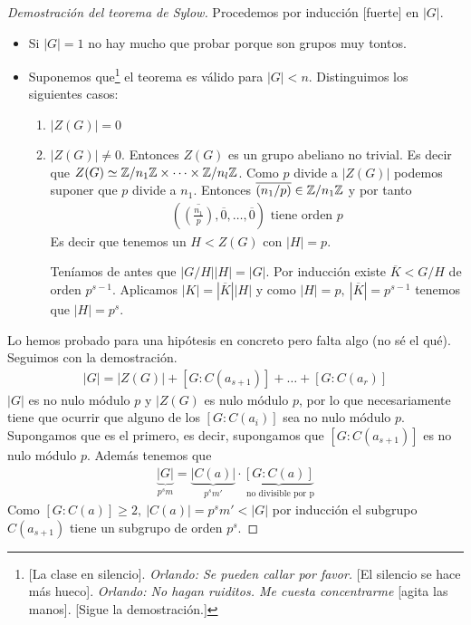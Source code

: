 \begin{proof}[Demostración del teorema de Sylow]
	Procedemos por inducción [fuerte] en $|G|$.
	\begin{itemize}
		\item Si $|G| = 1$ no hay mucho que probar porque son grupos muy tontos.
		\item Suponemos que\footnote{[La clase en silencio]. \textit{Orlando: Se pueden callar por favor.} [El silencio se hace más hueco]. \textit{Orlando: No hagan ruiditos. Me cuesta concentrarme} [agita las manos]. [Sigue la demostración.]} el teorema es válido para $|G| < n$. Distinguimos los siguientes casos:
		\begin{enumerate}
			\item $|Z(G)| = 0$
			\item $|Z(G)| \neq 0$. Entonces $Z(G)$ es un grupo abeliano no trivial. Es decir que $Z(G) \simeq \mathbb{Z}/n_1\mathbb{Z} \times \dots \times \mathbb{Z}/n_l\mathbb{Z}$. Como $p$ divide a $|Z(G)|$ podemos suponer que $p$ divide a $n_1$. Entonces $\overline{(n_1/p)} \in \mathbb{Z}/n_1\mathbb{Z}$ y por tanto
			\begin{align*}
				(\overline{\left(\frac{n_1}{p}\right)}, \overline{0}, \dots, \overline{0}) \text{ tiene orden } p
			\end{align*}
			Es decir que tenemos un $H < Z(G)$ con $|H| = p$.
			
			Teníamos de antes que $|G/H| |H| = |G|$. Por inducción existe $\overline{K} < G/H$ de orden $p^{s-1}$. Aplicamos $|K| = |\overline{K}||H|$ y como $|H| = p,\ |\overline{K}| = p^{s-1}$ tenemos que $|H| = p^s$.
		\end{enumerate}
	\end{itemize}

	Lo hemos probado para una hipótesis en concreto pero falta algo (no sé el qué). Seguimos con la demostración.
	\begin{align*}
		|G| = |Z(G)| + [G:C(a_{s+1})] + \dots  + [G:C(a_r)]
	\end{align*}
	$|G|$ es no nulo módulo $p$ y $|Z(G)$ es nulo módulo $p$, por lo que necesariamente tiene que ocurrir que alguno de los $[G:C(a_i)]$ sea no nulo módulo $p$. Supongamos que es el primero, es decir, supongamos que $[G:C(a_{s+1})]$ es no nulo módulo $p$. Además tenemos que
	\begin{align*}
		\underbrace{|G|}_{p^sm} = \underbrace{|C(a)|}_{p^sm'}\cdot \underbrace{[G:C(a)]}_{\text{ no divisible por p}}
	\end{align*}
	Como $[G:C(a)] \geq 2,\ |C(a)| = p^sm' < |G|$ por inducción el subgrupo $C(a_{s+1})$ tiene un subgrupo de orden $p^s$.
\end{proof}

